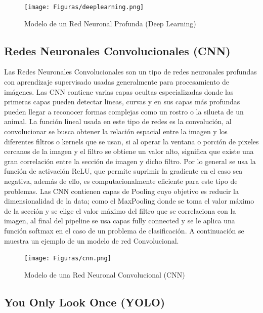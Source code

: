 \documentclass[conference]{IEEEtran}
\begin{document}
\begin{figure}[hbtp]
\centering
\texttt{[image: Figuras/deeplearning.png]}
\caption{Modelo de un Red Neuronal Profunda (Deep Learning)}
\label{fig:deeplearning}
\end{figure}

\subsection{Redes Neuronales Convolucionales (CNN)}
Las Redes Neuronales Convolucionales son un tipo de redes neuronales profundas con aprendizaje supervisado usadas generalmente para procesamiento de imágenes. Las CNN contiene varias capas ocultas especializadas donde las primeras capas pueden detectar lineas, curvas y en sus capas más profundas pueden llegar a reconocer formas complejas como un rostro o la silueta de un animal.
La función lineal usada en este tipo de redes es la convolución, al convolucionar se busca obtener la relación espacial entre la imagen y los diferentes filtros o kernels que se usan, si al operar la ventana o porción de pixeles cercanos de la imagen  y el filtro se obtiene un valor alto, significa que existe una gran correlación entre la sección de imagen y dicho filtro. Por lo general se usa la función de activación ReLU, que permite suprimir la gradiente en el caso sea negativa, además de ello, es computacionalmente eficiente para este tipo de problemas. Las CNN contienen capas de Pooling cuyo objetivo es reducir la dimensionalidad de la data; como el MaxPooling donde se toma el valor máximo de la sección y se elige el valor máximo del filtro que se correlaciona con la imagen, al final del pipeline se usa capas fully connected y se le aplica una función softmax en el caso de un problema de clasificación. A continuación se muestra un ejemplo de un modelo de red Convolucional.

\begin{figure}[hbtp]
\centering
\texttt{[image: Figuras/cnn.png]}
\caption{Modelo de una Red Neuronal Convolucional (CNN)}
\label{fig:cnn}
\end{figure}

\subsection{You Only Look Once (YOLO)}
\end{document}
